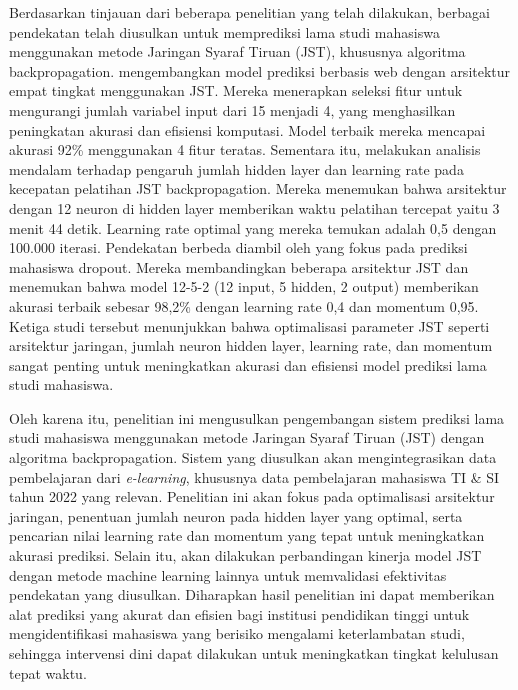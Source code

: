 Berdasarkan tinjauan dari beberapa penelitian yang telah dilakukan, berbagai pendekatan telah diusulkan untuk memprediksi lama studi mahasiswa menggunakan metode Jaringan Syaraf Tiruan (JST), khususnya algoritma backpropagation. \cite{hossen2021web} mengembangkan model prediksi berbasis web dengan arsitektur empat tingkat menggunakan JST. Mereka menerapkan seleksi fitur untuk mengurangi jumlah variabel input dari 15 menjadi 4, yang menghasilkan peningkatan akurasi dan efisiensi komputasi. Model terbaik mereka mencapai akurasi 92\% menggunakan 4 fitur teratas. Sementara itu, \cite{sunardi2022pengaruh} melakukan analisis mendalam terhadap pengaruh jumlah hidden layer dan learning rate pada kecepatan pelatihan JST backpropagation. Mereka menemukan bahwa arsitektur dengan 12 neuron di hidden layer memberikan waktu pelatihan tercepat yaitu 3 menit 44 detik. Learning rate optimal yang mereka temukan adalah 0,5 dengan 100.000 iterasi. Pendekatan berbeda diambil oleh \cite{sari2021analisis} yang fokus pada prediksi mahasiswa dropout. Mereka membandingkan beberapa arsitektur JST dan menemukan bahwa model 12-5-2 (12 input, 5 hidden, 2 output) memberikan akurasi terbaik sebesar 98,2\% dengan learning rate 0,4 dan momentum 0,95. Ketiga studi tersebut menunjukkan bahwa optimalisasi parameter JST seperti arsitektur jaringan, jumlah neuron hidden layer, learning rate, dan momentum sangat penting untuk meningkatkan akurasi dan efisiensi model prediksi lama studi mahasiswa.

Oleh karena itu, penelitian ini mengusulkan pengembangan sistem prediksi lama studi mahasiswa menggunakan metode Jaringan Syaraf Tiruan (JST) dengan algoritma backpropagation. Sistem yang diusulkan akan mengintegrasikan data pembelajaran dari \textit{e-learning}, khususnya data pembelajaran mahasiswa TI & SI tahun 2022 yang relevan. Penelitian ini akan fokus pada optimalisasi arsitektur jaringan, penentuan jumlah neuron pada hidden layer yang optimal, serta pencarian nilai learning rate dan momentum yang tepat untuk meningkatkan akurasi prediksi. Selain itu, akan dilakukan perbandingan kinerja model JST dengan metode machine learning lainnya untuk memvalidasi efektivitas pendekatan yang diusulkan. Diharapkan hasil penelitian ini dapat memberikan alat prediksi yang akurat dan efisien bagi institusi pendidikan tinggi untuk mengidentifikasi mahasiswa yang berisiko mengalami keterlambatan studi, sehingga intervensi dini dapat dilakukan untuk meningkatkan tingkat kelulusan tepat waktu.

